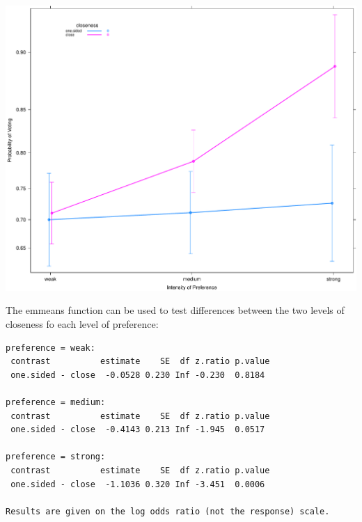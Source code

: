 \documentclass[
]{article}
\newenvironment{Shaded}{\begin{snugshade}}{\end{snugshade}}
\newcommand{\KeywordTok}[1]{\textcolor[rgb]{0.13,0.29,0.53}{\textbf{#1}}}
\newcommand{\NormalTok}[1]{#1}
\newcommand{\OperatorTok}[1]{\textcolor[rgb]{0.81,0.36,0.00}{\textbf{#1}}}
\newcommand{\StringTok}[1]{\textcolor[rgb]{0.31,0.60,0.02}{#1}}
\begin{document}
\includegraphics{LogisticRegressCh6_files/figure-latex/unnamed-chunk-10-1.pdf}

The emmeans function can be used to test differences between the two
levels of closeness fo each level of preference:

\begin{Shaded}
\end{Shaded}

\begin{verbatim}
preference = weak:
 contrast          estimate    SE  df z.ratio p.value
 one.sided - close  -0.0528 0.230 Inf -0.230  0.8184 

preference = medium:
 contrast          estimate    SE  df z.ratio p.value
 one.sided - close  -0.4143 0.213 Inf -1.945  0.0517 

preference = strong:
 contrast          estimate    SE  df z.ratio p.value
 one.sided - close  -1.1036 0.320 Inf -3.451  0.0006 

Results are given on the log odds ratio (not the response) scale. 
\end{verbatim}
\end{document}
